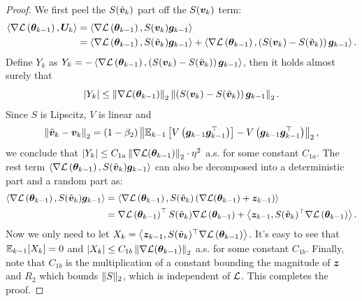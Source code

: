 \begin{proof}
    We first peel the $S(\tilde{{\bm{v}}}_k)$ part off the $S({\bm{v}}_k)$ term: 
    \begin{align*}
        \left\langle\nabla\mathcal{L}\left({\bm{\theta}}_{k-1}\right), {\bm{U}}_k\right\rangle &= \left\langle\nabla\mathcal{L}\left({\bm{\theta}}_{k-1}\right), S({\bm{v}}_k) {\bm{g}}_{k-1}\right\rangle \\
        &= \left\langle\nabla\mathcal{L}\left({\bm{\theta}}_{k-1}\right), S(\tilde{{\bm{v}}}_k) {\bm{g}}_{k-1}\right\rangle + \left\langle\nabla\mathcal{L}\left({\bm{\theta}}_{k-1}\right), \left(S({\bm{v}}_k) - S(\tilde{{\bm{v}}}_k)\right) {\bm{g}}_{k-1}\right\rangle.
    \end{align*}
    Define $Y_k$ as $Y_k = -\left\langle\nabla\mathcal{L}\left({\bm{\theta}}_{k-1}\right), \left(S({\bm{v}}_k) - S(\tilde{{\bm{v}}}_k)\right) {\bm{g}}_{k-1}\right\rangle$, then it holds almost surely that 
    $$\left|Y_k \right| \leq \left\|\nabla \mathcal{L}({\bm{\theta}}_{k-1})\right\|_2\left\|\left(S({\bm{v}}_k) - S(\tilde{{\bm{v}}}_k)\right) {\bm{g}}_{k-1}\right\|_2.$$ 
    Since $S$ is Lipscitz, $V$ is linear and 
    $$\left\|\tilde{{\bm{v}}}_k - {\bm{v}}_k\right\|_2 = (1-\beta_2)\left\|\mathbb{E}_{k-1}\left[V\left({\bm{g}}_{k-1}{\bm{g}}_{k-1}^\top\right)\right] - V\left({\bm{g}}_{k-1}{\bm{g}}_{k-1}^\top\right)\right\|_2,$$ we conclude that $\left| Y_k \right| \leq C_{1a} \left\|\nabla \mathcal{L}({\bm{\theta}}_{k-1})\right\|_2\cdot \eta^2$ a.s. for some constant $C_{1a}$. The rest term $\left\langle\nabla\mathcal{L}\left({\bm{\theta}}_{k-1}\right), S(\tilde{{\bm{v}}}_k) {\bm{g}}_{k-1}\right\rangle$ can also be decomposed into a deterministic part and a random part as: \begin{align*}
        \left\langle\nabla\mathcal{L}\left({\bm{\theta}}_{k-1}\right), S(\tilde{{\bm{v}}}_k) {\bm{g}}_{k-1}\right\rangle &= \left\langle\nabla\mathcal{L}\left({\bm{\theta}}_{k-1}\right), S(\tilde{{\bm{v}}}_k) \left(\nabla \mathcal{L}({\bm{\theta}}_{k-1}) + {\bm{z}}_{k-1}\right)\right\rangle \\
        &= \nabla\mathcal{L}\left({\bm{\theta}}_{k-1}\right)^\top S(\tilde{{\bm{v}}}_k) \nabla\mathcal{L}\left({\bm{\theta}}_{k-1}\right) + \left\langle {\bm{z}}_{k-1}, S(\tilde{{\bm{v}}}_k)^\top \nabla\mathcal{L}\left({\bm{\theta}}_{k-1}\right)\right\rangle.
    \end{align*}
    Now we only need to let $X_k = \left\langle {\bm{z}}_{k-1}, S(\tilde{{\bm{v}}}_k)^\top \nabla\mathcal{L}\left({\bm{\theta}}_{k-1}\right)\right\rangle$. It's easy to see that $\mathbb{E}_{k-1}[X_k] = 0$ and $\left| X_k \right| \leq C_{1b} \left\|\nabla \mathcal{L}({\bm{\theta}}_{k-1})\right\|_2$ a.s. for some constant $C_{1b}$. Finally, note that $C_{1b}$ is the multiplication of a constant bounding the magnitude of ${\bm{z}}$ and $R_2$ which bounds $\|S\|_2$, which is independent of $\mathcal{L}$. This completes the proof.
\end{proof}


